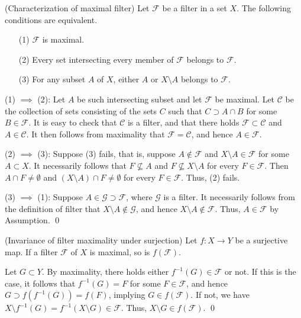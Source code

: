 \documentclass{report}
\begin{document}
\begin{thm}\label{characterize maximal filter} (Characterization of maximal filter)
    Let \( \mathscr{F} \) be a filter in a set \( X \). The following conditions are equivalent.
    \begin{itemize}
        \item[(1)] \( \mathscr{F} \) is maximal.
        \item[(2)] Every set intersecting every member of \( \mathscr{F} \) belongs to \( \mathscr{F} \).
        \item[(3)] For any subset \( A \) of \( X \), either \( A \) or \( X \setminus A \) belongs to \( \mathscr{F} \).
    \end{itemize}
\end{thm}
\begin{prf}
    (1) \( \implies \) (2):
    Let \( A \) be such intersecting subset and let \( \mathscr{F} \) be maximal. Let \( \mathscr{C} \) be the collection of sets consisting of the sets \( C \) such that \( C \supset A \cap B \) for some \( B \in \mathscr{F} \). It is easy to check that \( \mathscr{C} \) is a filter, and that there holds \( \mathscr{F} \subset \mathscr{C} \) and \( A \in \mathscr{C} \). It then follows from maximality that \( \mathscr{F} = \mathscr{C} \), and hence \( A \in \mathscr{F} \).

    (2) \( \implies \) (3):
    Suppose (3) fails, that is, suppose \( A \notin \mathscr{F} \) and \( X \setminus A \in \mathscr{F} \) for some \( A \subset X\). It necessarily follows that \( F \nsubseteq A \) and \( F \nsubseteq X \setminus A \) for every \( F \in \mathscr{F} \). Then \( A \cap F \neq \emptyset \) and \( \left( X \setminus A \right) \cap F \neq \emptyset \) for every \( F \in \mathscr{F} \). Thus, (2) fails.

    (3) \( \implies \) (1):
    Suppose \( A \in \mathscr{G} \supset \mathscr{F} \), where \( \mathscr{G} \) is a filter. It necessarily follows from the definition of filter that \( X \setminus A \notin \mathscr{G} \), and hence \( X \setminus A \notin \mathscr{F} \). Thus, \( A \in \mathscr{F} \) by Assumption.
    \qed\end{prf}

\begin{prp}\label{invariace of maximality under surjection} (Invariance of filter maximality under surjection)
    Let \( f:X \to Y \) be a surjective map. If a filter \( \mathscr{F} \) of \( X \) is maximal, so is \( f(\mathscr{F}) \).
\end{prp}
\begin{prf}
    Let \( G \subset Y \). By maximality, there holds either \( f^{-1}(G)\in \mathscr{F} \) or not. If this is the case, it follows that \( f^{-1}(G) = F \) for some \( F \in \mathscr{F} \), and hence \( G \supset f(f^{-1}(G))=f(F) \), implying \( G \in f(\mathscr{F}) \). If not, we have \( X \setminus f^{-1}(G) = f^{-1}(X \setminus G) \in \mathscr{F} \). Thus, \( X \setminus G \in f(\mathscr{F}) \).
    \qed\end{prf}
\end{document}
